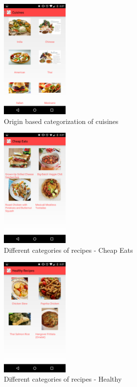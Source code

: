 \begin{figure}[ht!]
	\centering
	\includegraphics[width=0.3\textwidth, height=0.3\textheight]{images/cuisines.png}
	\caption{Origin based categorization of cuisines\label{fig_2}}
\end{figure}

\begin{figure}[ht!]
	\centering
	\includegraphics[width=0.3\textwidth, height=0.3\textheight]{images/cheap_eats.png}
	\caption{Different categories of recipes - Cheap Eats\label{fig_3}}
\end{figure}

\begin{figure}[ht!]
	\centering
	\includegraphics[width=0.3\textwidth, height=0.3\textheight]{images/healthy.png}
	\caption{Different categories of recipes - Healthy\label{fig_4}}
\end{figure}

